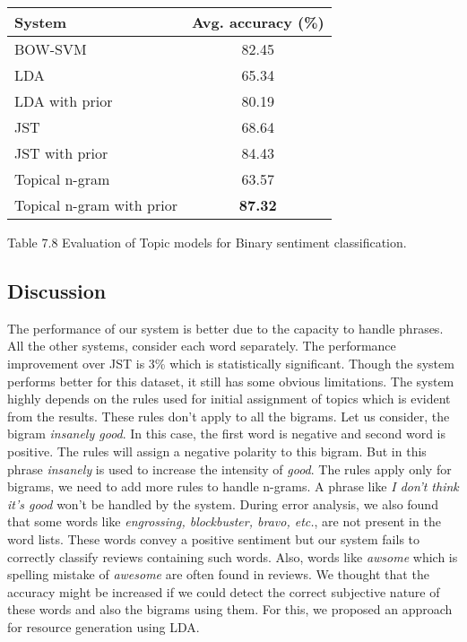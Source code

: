 \begin{center}
\begin{tabular}{|l|c|}
\hline \bf System & \bf Avg. accuracy (\%)\\ \hline
BOW-SVM & 82.45\\
LDA & 65.34\\
LDA with prior & 80.19\\
JST & 68.64\\
JST with prior & 84.43\\
Topical n-gram & 63.57\\
Topical n-gram with prior & \textbf{87.32}\\
\hline
\end{tabular}
\end{center}
\begin{center}
 Table 7.8 Evaluation of Topic models for Binary sentiment classification.
\end{center}

\subsection*{Discussion}\label{discussion}

The performance of our system is better due to the capacity to handle phrases. All the other systems, consider each word
separately. The performance improvement over JST is 3\% which is statistically significant. Though the system performs
better for this dataset, it still has some obvious limitations. The system highly depends on the rules used for
initial assignment of topics which is evident from the results. These rules don't apply to all the bigrams. Let us
consider, the bigram \textit{insanely good}. In this case, the first word is negative and second word is positive. The rules
will assign a negative polarity to this bigram. But in this phrase \textit{insanely} is used to increase the intensity of 
\textit{good}. The rules apply only for bigrams, we need to add more rules to handle n-grams. A phrase like \textit{I don't
think it's good} won't be handled by the system. During error analysis, we also found that some words like \textit{engrossing,
blockbuster, bravo, etc.}, are not present in the word lists. These words convey a positive sentiment but our system fails
to correctly classify reviews containing such words. Also, words like \textit{awsome} which is spelling mistake of \textit{awesome}
are often found in reviews. We thought that the accuracy might be increased if we could detect the correct subjective
nature of these words and also the bigrams using them. For this, we proposed  an approach for resource generation using LDA.

